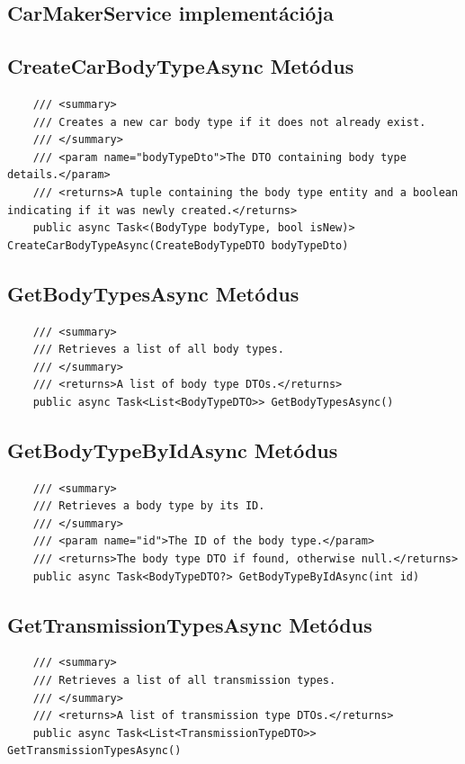 \documentclass{report}[11pt]
\begin{document}
\subsection{CarMakerService implementációja}

\subsection*{CreateCarBodyTypeAsync Metódus}
\begin{lstlisting}
    /// <summary>
    /// Creates a new car body type if it does not already exist.
    /// </summary>
    /// <param name="bodyTypeDto">The DTO containing body type details.</param>
    /// <returns>A tuple containing the body type entity and a boolean indicating if it was newly created.</returns>
    public async Task<(BodyType bodyType, bool isNew)> CreateCarBodyTypeAsync(CreateBodyTypeDTO bodyTypeDto)
\end{lstlisting}


\subsection*{GetBodyTypesAsync Metódus}
\begin{lstlisting}
    /// <summary>
    /// Retrieves a list of all body types.
    /// </summary>
    /// <returns>A list of body type DTOs.</returns>
    public async Task<List<BodyTypeDTO>> GetBodyTypesAsync()
\end{lstlisting}

\subsection*{GetBodyTypeByIdAsync Metódus}
\begin{lstlisting}
    /// <summary>
    /// Retrieves a body type by its ID.
    /// </summary>
    /// <param name="id">The ID of the body type.</param>
    /// <returns>The body type DTO if found, otherwise null.</returns>
    public async Task<BodyTypeDTO?> GetBodyTypeByIdAsync(int id)
\end{lstlisting}

\subsection*{GetTransmissionTypesAsync Metódus}
\begin{lstlisting}
    /// <summary>
    /// Retrieves a list of all transmission types.
    /// </summary>
    /// <returns>A list of transmission type DTOs.</returns>
    public async Task<List<TransmissionTypeDTO>> GetTransmissionTypesAsync()
\end{lstlisting}
\end{document}
